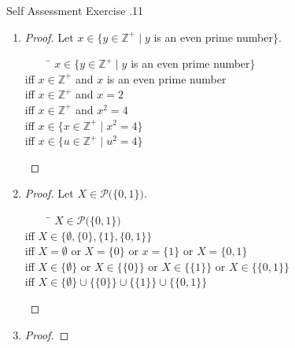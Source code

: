 \documentclass[../notes.tex]{subfiles}
\begin{document}
			\pagebreak
			\begin{exercise}{Self Assessment Exercise \thechapter.11}
				\begin{enumerate}
					\item {}
						\begin{proof}
							Let $x \in \{y \in \mathbb{Z}^{+} \mid y$ is an even prime number$\}$.
							\begin{tabbing}
								$\qquad$ \= $x \in \{y \in \mathbb{Z}^{+} \mid y$ is an even prime number$\}$\\
								iff      \> $x \in \mathbb{Z}^{+}$ and $x$ is an even prime number\\
								iff      \> $x \in \mathbb{Z}^{+}$ and $x = 2$\\
								iff      \> $x \in \mathbb{Z}^{+}$ and $x^{2} = 4$\\
								iff      \> $x \in \{x \in \mathbb{Z}^{+} \mid x^{2} = 4\}$\\
								iff      \> $x \in \{u \in \mathbb{Z}^{+} \mid u^{2} = 4\}$
							\end{tabbing}
						\end{proof}
					\item \question{$\mathcal{P}\bigl(\{0, 1\}\bigr) = \{\emptyset\} \cup \bigl\{\{0\}\bigr\} \cup \bigl\{\{1\}\bigr\} \cup \bigl\{\{0, 1\}\bigr\}$}
						\begin{proof}
							Let $X \in \mathcal{P}\bigl(\{0, 1\}\bigr)$.
							\begin{tabbing}
								$\qquad$ \= $X \in \mathcal{P}\bigl(\{0, 1\}\bigr)$\\
								iff \> $X \in \bigl\{\emptyset, \{0\}, \{1\}, \{0, 1\}\bigr\}$\\
								iff \> $X = \emptyset$ or $X = \{0\}$ or $x = \{1\}$ or $X = \{0, 1\}$\\
								iff \> $X \in \{\emptyset\}$ or $X \in \bigl\{\{0\}\bigr\}$ or $X \in \bigl\{\{1\}\bigr\}$ or $X \in \bigl\{\{0, 1\}\bigr\}$\\
								iff \> $X \in \{\emptyset\} \cup \bigl\{\{0\}\bigr\} \cup \bigl\{\{1\}\bigr\} \cup \bigl\{\{0, 1\}\bigr\}$
							\end{tabbing}
						\end{proof}
					\item {}
						\begin{proof}

\end{proof}
\end{enumerate}
\end{exercise}
\end{document}
